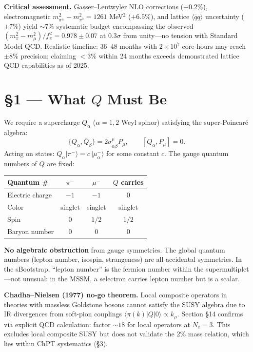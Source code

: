 \documentclass[11pt,a4paper]{article}
\newcommand{\fpi}{f_\pi}
\newcommand{\mpi}{m_\pi}
\newcommand{\mmu}{m_\mu}
\newcommand{\qqbar}{\langle\bar{q}q\rangle}
\newcommand{\Nc}{N_c}
\begin{document}
\textbf{Critical assessment.}  Gasser--Leutwyler NLO corrections ($+0.2\%$), electromagnetic $m_{\pi^\pm}^2-m_{\pi^0}^2=1261$ MeV$^2$ ($+6.5\%$), and lattice $\qqbar$ uncertainty ($\pm 7\%$) yield $\sim 7\%$ systematic budget encompassing the observed $(\mpi^2-\mmu^2)/\fpi^2=0.978\pm 0.07$ at $0.3\sigma$ from unity---no tension with Standard Model QCD.  Realistic timeline: $36$--$48$ months with $2\times 10^7$ core-hours may reach $\pm 8\%$ precision; claiming ${<}3\%$ within 24 months exceeds demonstrated lattice QCD capabilities as of 2025.

\section*{\S 1 --- What $Q$ Must Be}

We require a supercharge $Q_\alpha$ ($\alpha=1,2$ Weyl spinor) satisfying the super-Poincar\'e algebra:
\begin{equation}
\{Q_\alpha, \bar{Q}_{\dot{\beta}}\} = 2\sigma^\mu_{\alpha\dot{\beta}} P_\mu, \qquad [Q_\alpha, P_\mu] = 0.
\end{equation}
Acting on states: $Q_\alpha|\pi^-\rangle = c\,|\mu^-_\alpha\rangle$ for some constant $c$.  The gauge quantum numbers of $Q$ are fixed:

\begin{center}
\begin{tabular}{lccc}
\toprule
Quantum \# & $\pi^-$ & $\mu^-$ & $Q$ carries \\
\midrule
Electric charge & $-1$ & $-1$ & $0$ \\
Color & singlet & singlet & singlet \\
Spin & $0$ & $1/2$ & $1/2$ \\
Baryon number & $0$ & $0$ & $0$ \\
\bottomrule
\end{tabular}
\end{center}

\textbf{No algebraic obstruction} from gauge symmetries.  The global quantum numbers (lepton number, isospin, strangeness) are all accidental symmetries.  In the sBootstrap, ``lepton number'' is the fermion number within the supermultiplet---not unusual: in the MSSM, a selectron carries lepton number but is a scalar.

\textbf{Chadha--Nielsen (1977) no-go theorem.}  Local composite operators in theories with massless Goldstone bosons cannot satisfy the SUSY algebra due to IR divergences from soft-pion couplings $\langle\pi(k)|Q|0\rangle \propto k_\mu$.  Section \S 14 confirms via explicit QCD calculation: factor $\sim 18$ for local operators at $\Nc=3$.  This excludes local composite SUSY but does not validate the 2\% mass relation, which lies within ChPT systematics (\S 3).
\end{document}
